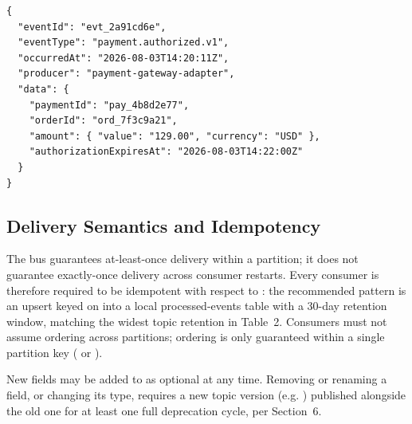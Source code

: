 \begin{lstlisting}
{
  "eventId": "evt_2a91cd6e",
  "eventType": "payment.authorized.v1",
  "occurredAt": "2026-08-03T14:20:11Z",
  "producer": "payment-gateway-adapter",
  "data": {
    "paymentId": "pay_4b8d2e77",
    "orderId": "ord_7f3c9a21",
    "amount": { "value": "129.00", "currency": "USD" },
    "authorizationExpiresAt": "2026-08-03T14:22:00Z"
  }
}
\end{lstlisting}

\subsection{Delivery Semantics and Idempotency}
The bus guarantees at-least-once delivery within a partition; it does not guarantee exactly-once
delivery across consumer restarts. Every consumer is therefore required to be idempotent with
respect to : the recommended pattern is an upsert keyed on  into a
local processed-events table with a 30-day retention window, matching the widest topic
retention in Table~2. Consumers must not assume ordering across partitions; ordering is only
guaranteed within a single partition key ( or ).

\begin{infobox}[title={Schema Evolution Rule}]
New fields may be added to  as optional at any time. Removing or renaming a field,
or changing its type, requires a new topic version (e.g. ) published
alongside the old one for at least one full deprecation cycle, per Section~6.
\end{infobox}
